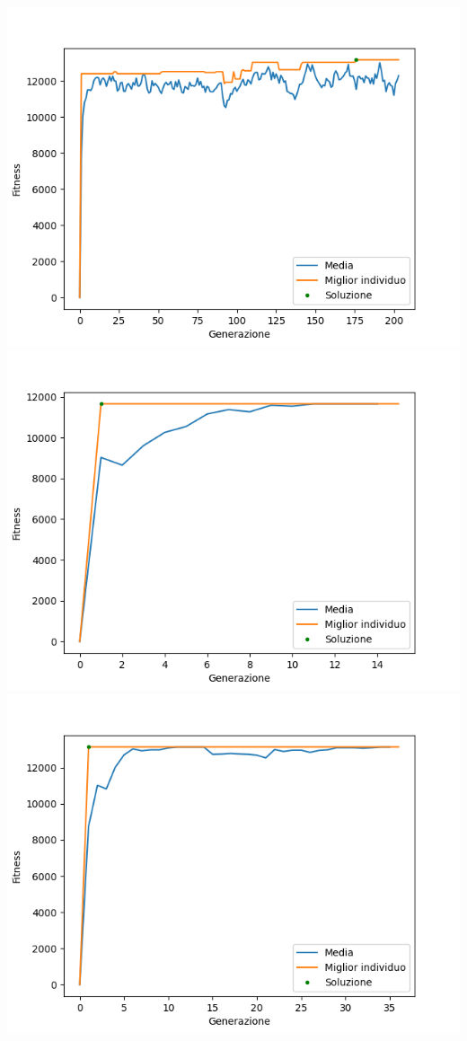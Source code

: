 \documentclass{CSUniSchoolLabReport}
\begin{document}
\begin{center}
	\includegraphics[scale=0.25]{results/6}
	\includegraphics[scale=0.25]{results/7}
	\includegraphics[scale=0.25]{results/8}

\end{center}
\end{document}
